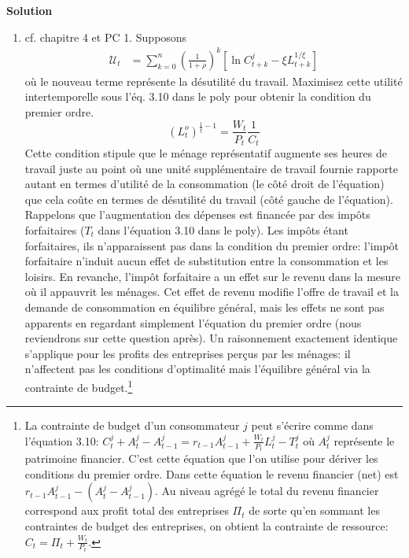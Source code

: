\documentclass[a4paper,11pt]{article}
\begin{document}
\bigskip
\begin{center}
\textbf{Solution}
\end{center}

\bigskip



\begin{enumerate}
\item cf. chapitre 4 et PC 1. Supposons \begin{align}
\mathcal{U}_{t}  &  =\sum_{k=0}^{n}\left(  \frac{1}{1+\rho}\right)  ^{k}  \left[\ln
C_{t+k}^{j}  -\xi L_{t+k}^{1/\xi} \right]\label{2 - utilite intertemporelle}
\end{align}
où le nouveau terme représente la désutilité du travail. Maximisez cette utilité intertemporelle sous  l'éq. 3.10 dans le poly pour obtenir la condition du premier ordre. 
\begin{equation*}
\left(L_{t}^{o}\right)^{\frac{1}{\xi }-1}=\frac{W_{t}}{P_{t}} \frac{1}{C_t}\end{equation*}
Cette condition stipule que le ménage représentatif augmente ses heures de travail juste au point où une unité supplémentaire
de travail fournie rapporte autant en termes d'utilité de la consommation (le côté droit de l'équation) que cela coûte en termes 
de désutilité du travail (côté gauche de l'équation). Rappelons que l'augmentation des dépenses est financée par des impôts 
forfaitaires ($ T_t $ dans l'équation 3.10 dans le poly). Les impôts étant forfaitaires, ils n'apparaissent pas
dans la condition du premier ordre: l'impôt forfaitaire n'induit aucun effet de substitution entre la consommation et les loisirs. 
En revanche, l'impôt forfaitaire a un effet sur le revenu dans la mesure où il appauvrit les ménages. 
Cet effet de revenu  modifie l'offre de travail et la demande de consommation en équilibre général, mais les effets 
ne sont pas apparents en regardant simplement l'équation du premier ordre (nous reviendrons sur cette question après).
Un raisonnement exactement identique s'applique pour les profits des entreprises perçus par les ménages: 
il n'affectent pas les conditions d'optimalité mais l'équilibre général via la contrainte de budget.\footnote{La 
contrainte de budget d'un consommateur $j$ peut s'écrire comme dans l'équation 3.10: 
$C^j_t + A^j_t - A^j_{t-1} = r_{t-1}A^j_{t-1} + \frac{W_t}{P_t}L^j_t  - T^j_t$ où $A^j_t$ représente le patrimoine financier.
 C'est cette équation que l'on utilise pour dériver les conditions du premier ordre. Dans cette équation le revenu financier (net) est
 $r_{t-1}A^j_{t-1} - (A^j_t - A^j_{t-1})$. Au niveau agrégé le total du revenu financier correspond aux profit total des entreprises $\Pi_t$ de sorte qu'en sommant
 les contraintes de budget des entreprises, on obtient la contrainte de ressource: $C_t = \Pi_t + \frac{W_t}{P_t}$.}





\end{enumerate}
\end{document}
